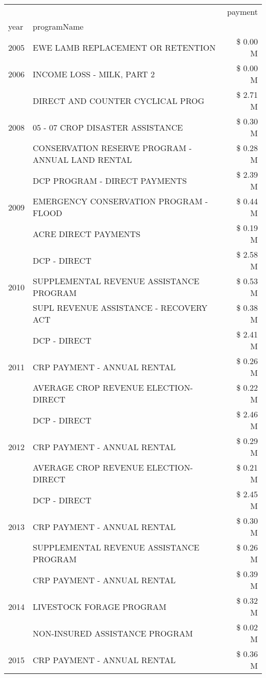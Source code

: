 \begin{tabular}{llr}
\toprule
 &  & payment \\
year & programName &  \\
\midrule
2005 & EWE LAMB REPLACEMENT OR RETENTION & \$ 0.00 M \\
\cline{1-3}
2006 & INCOME LOSS - MILK, PART 2 & \$ 0.00 M \\
\cline{1-3}
\multirow[t]{3}{*}{2008} & DIRECT AND COUNTER CYCLICAL PROG & \$ 2.71 M \\
 & 05 - 07 CROP DISASTER ASSISTANCE & \$ 0.30 M \\
 & CONSERVATION RESERVE PROGRAM - ANNUAL LAND RENTAL & \$ 0.28 M \\
\cline{1-3}
\multirow[t]{3}{*}{2009} & DCP PROGRAM - DIRECT PAYMENTS & \$ 2.39 M \\
 & EMERGENCY CONSERVATION PROGRAM - FLOOD & \$ 0.44 M \\
 & ACRE DIRECT PAYMENTS & \$ 0.19 M \\
\cline{1-3}
\multirow[t]{3}{*}{2010} & DCP - DIRECT & \$ 2.58 M \\
 & SUPPLEMENTAL REVENUE ASSISTANCE PROGRAM & \$ 0.53 M \\
 & SUPL REVENUE ASSISTANCE - RECOVERY ACT & \$ 0.38 M \\
\cline{1-3}
\multirow[t]{3}{*}{2011} & DCP - DIRECT & \$ 2.41 M \\
 & CRP PAYMENT - ANNUAL RENTAL & \$ 0.26 M \\
 & AVERAGE CROP REVENUE ELECTION-DIRECT & \$ 0.22 M \\
\cline{1-3}
\multirow[t]{3}{*}{2012} & DCP - DIRECT & \$ 2.46 M \\
 & CRP PAYMENT - ANNUAL RENTAL & \$ 0.29 M \\
 & AVERAGE CROP REVENUE ELECTION-DIRECT & \$ 0.21 M \\
\cline{1-3}
\multirow[t]{3}{*}{2013} & DCP - DIRECT & \$ 2.45 M \\
 & CRP PAYMENT - ANNUAL RENTAL & \$ 0.30 M \\
 & SUPPLEMENTAL REVENUE ASSISTANCE PROGRAM & \$ 0.26 M \\
\cline{1-3}
\multirow[t]{3}{*}{2014} & CRP PAYMENT - ANNUAL RENTAL & \$ 0.39 M \\
 & LIVESTOCK FORAGE PROGRAM & \$ 0.32 M \\
 & NON-INSURED ASSISTANCE PROGRAM & \$ 0.02 M \\
\cline{1-3}
\multirow[t]{2}{*}{2015} & CRP PAYMENT - ANNUAL RENTAL & \$ 0.36 M \\

\end{tabular}
